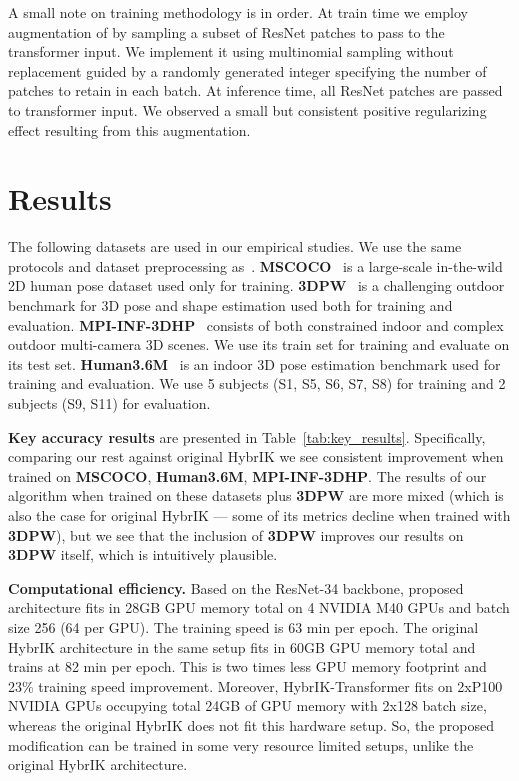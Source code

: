 \documentclass[sigconf,final]{acmart}
\begin{document}
A small note on training methodology is in order. At train time we employ augmentation of  by sampling a subset of ResNet patches to pass to the transformer input. We implement it using multinomial sampling without replacement guided by a randomly generated integer specifying the number of patches to retain in each batch. At inference time, all ResNet patches are passed to transformer input. We observed a small but consistent positive regularizing effect resulting from this augmentation.

\section{Results}

The following datasets are used in our empirical studies. We use the same protocols and dataset preprocessing as~\citet{li2021hybrik}. \textbf{MSCOCO}~\cite{cocodataset} is a large-scale in-the-wild 2D human pose dataset used only for training. \textbf{3DPW}~\cite{vonMarcard2018} is a challenging outdoor benchmark for 3D pose and shape estimation used both for training and evaluation. \textbf{MPI-INF-3DHP}~\cite{mehta2017monocular} consists of both constrained indoor and complex outdoor multi-camera 3D scenes. We use its train set for training and evaluate on its test set. \textbf{Human3.6M}~\cite{IonescuSminchisescu11} is an indoor 3D pose estimation benchmark used for training and evaluation. We use 5 subjects (S1, S5, S6, S7, S8) for training and 2 subjects (S9, S11) for evaluation. 

\textbf{Key accuracy results} are presented in Table~\ref{tab:key_results}. Specifically, comparing our rest against original HybrIK we see consistent improvement when trained on \textbf{MSCOCO}, \textbf{Human3.6M}, \textbf{MPI-INF-3DHP}. The results of our algorithm when trained on these datasets plus \textbf{3DPW} are more mixed (which is also the case for original HybrIK --- some of its metrics decline when trained with \textbf{3DPW}), but we see that the inclusion of \textbf{3DPW} improves our results on \textbf{3DPW} itself, which is intuitively plausible.

\textbf{Computational efficiency.} Based on the ResNet-34 backbone, proposed architecture fits in 28GB GPU memory total on 4 NVIDIA M40 GPUs and batch size 256 (64 per GPU). The training speed is 63 min per epoch. The original HybrIK architecture in the same setup fits in 60GB GPU memory total and trains at 82 min per epoch. This is two times less GPU memory footprint and 23\% training speed improvement. Moreover, HybrIK-Transformer fits on 2xP100 NVIDIA GPUs occupying total 24GB of GPU memory with 2x128 batch size, whereas the original HybrIK does not fit this hardware setup. So, the proposed modification can be trained in some very resource limited setups, unlike the original HybrIK architecture.
\end{document}
